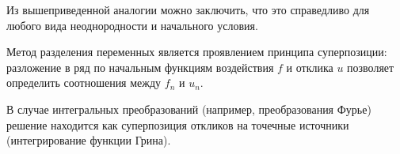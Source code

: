 Из вышеприведенной аналогии можно заключить, что это справедливо для любого вида
неоднородности и начального условия.


Метод разделения переменных является проявлением принципа суперпозиции:
разложение в ряд по начальным функциям воздействия \( f \) и отклика \( u \)
позволяет определить соотношения между \( f_n \) и \( u_n \).

В случае интегральных преобразований (например, преобразования Фурье) решение
находится как суперпозиция откликов на точечные источники (интегрирование
функции Грина).

\newpage
